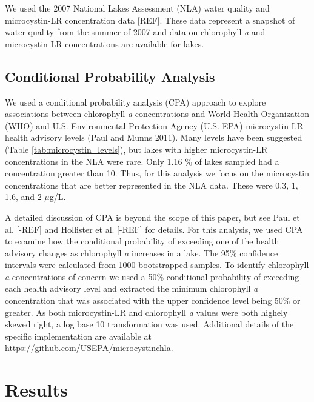 \documentclass[11pt,]{article}
\begin{document}
We used the 2007 National Lakes Assessment (NLA) water quality and
microcystin-LR concentration data {[}REF{]}. These data represent a
snapshot of water quality from the summer of 2007 and data on
chlorophyll \emph{a} and microcystin-LR concentrations are available for
lakes.

\subsection{Conditional Probability
Analysis}\label{conditional-probability-analysis}

We used a conditional probability analysis (CPA) approach to explore
associations between chlorophyll \emph{a} concentrations and World
Health Organization (WHO) and U.S. Environmental Protection Agency (U.S.
EPA) microcystin-LR health advisory levels (Paul and Munns 2011). Many
levels have been suggested (Table \ref{tab:microcystin_levels}), but
lakes with higher microcystin-LR concentrations in the NLA were rare.
Only 1.16 \% of lakes sampled had a concentration greater than 10. Thus,
for this analysis we focus on the microcystin concentrations that are
better represented in the NLA data. These were 0.3, 1, 1.6, and 2
\(\mu\)g/L.

A detailed discussion of CPA is beyond the scope of this paper, but see
Paul et al. {[}-REF{]} and Hollister et al. {[}-REF{]} for details. For
this analysis, we used CPA to examine how the conditional probability of
exceeding one of the health advisory changes as chlorophyll \emph{a}
increases in a lake. The 95\% confidence intervals were calculated from
1000 bootstrapped samples. To identify chlorophyll \emph{a}
concentrations of concern we used a 50\% conditional probability of
exceeding each health advisory level and extracted the minimum
chlorophyll \emph{a} concentration that was associated with the upper
confidence level being 50\% or greater. As both microcystin-LR and
chlorophyll \emph{a} values were both highely skewed right, a log base
10 transformation was used. Additional details of the specific
implementation are available at
\url{https://github.com/USEPA/microcystinchla}.

\section{Results}\label{results}
\end{document}
